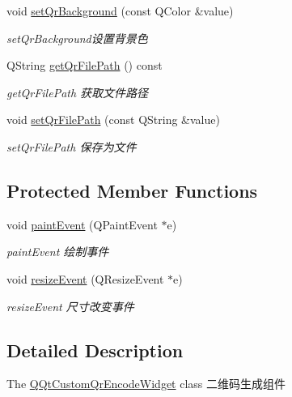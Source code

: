 \begin{DoxyCompactItemize}
void \mbox{\hyperlink{class_q_qt_custom_qr_encode_widget_a48a191027c5c5e1b759bb3131fe00eaa}{set\+Qr\+Background}} (const Q\+Color \&value)
\begin{DoxyCompactList}\small\item\em set\+Qr\+Background设置背景色 \end{DoxyCompactList}\item 
Q\+String \mbox{\hyperlink{class_q_qt_custom_qr_encode_widget_ae7b17229f55a99641af7e9f033a5b320}{get\+Qr\+File\+Path}} () const
\begin{DoxyCompactList}\small\item\em get\+Qr\+File\+Path 获取文件路径 \end{DoxyCompactList}\item 
void \mbox{\hyperlink{class_q_qt_custom_qr_encode_widget_a5ef5ead46d7cd7eafd2b47c0c5dcc02c}{set\+Qr\+File\+Path}} (const Q\+String \&value)
\begin{DoxyCompactList}\small\item\em set\+Qr\+File\+Path 保存为文件 \end{DoxyCompactList}\end{DoxyCompactItemize}
\subsection*{Protected Member Functions}
\begin{DoxyCompactItemize}
\item 
void \mbox{\hyperlink{class_q_qt_custom_qr_encode_widget_aca83a39caeffa59cbf554505d50a0988}{paint\+Event}} (Q\+Paint\+Event $\ast$e)
\begin{DoxyCompactList}\small\item\em paint\+Event 绘制事件 \end{DoxyCompactList}\item 
void \mbox{\hyperlink{class_q_qt_custom_qr_encode_widget_a2412b40b089c2e93704986130597b09d}{resize\+Event}} (Q\+Resize\+Event $\ast$e)
\begin{DoxyCompactList}\small\item\em resize\+Event 尺寸改变事件 \end{DoxyCompactList}\end{DoxyCompactItemize}


\subsection{Detailed Description}
The \mbox{\hyperlink{class_q_qt_custom_qr_encode_widget}{Q\+Qt\+Custom\+Qr\+Encode\+Widget}} class 二维码生成组件 

